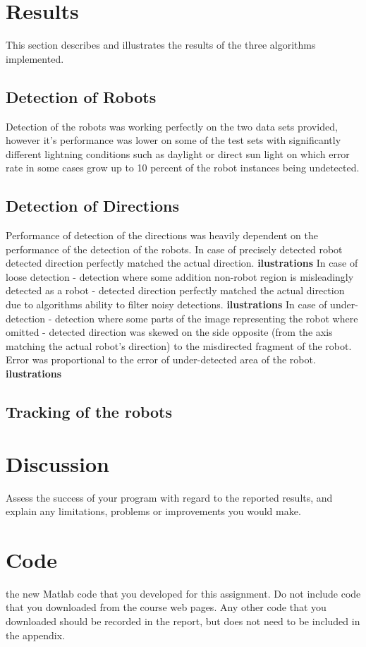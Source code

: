 \documentclass[10pt,a4paper,twocolumn]{article}
\begin{document}
\section{Results}
This section describes and illustrates the results of the three algorithms implemented. 
\subsection{Detection of Robots}
Detection of the robots was working perfectly on the two data sets provided, however it's performance was lower on some of the test sets with significantly different lightning conditions such as daylight or direct sun light on which error rate in some cases grow up to 10 percent of the robot instances being  undetected.  %
\subsection{Detection of Directions}
Performance of detection of the directions was heavily dependent on the performance of the detection of the robots. In case of precisely detected robot detected direction perfectly matched the actual direction. \textbf{ilustrations}
In case of loose detection - detection where some addition non-robot region is misleadingly detected as a robot - detected direction perfectly matched the actual direction due to algorithms ability to filter noisy detections. \textbf{ilustrations} 
In case of under-detection - detection where some parts of the image representing the robot where omitted - detected direction was skewed on the side opposite (from the axis matching the actual robot's direction) to the misdirected fragment of the robot. Error was proportional to the error of under-detected area of the robot. 
\textbf{ilustrations}
\subsection{Tracking of the robots}
\section{Discussion}
Assess the success of your program with regard to the reported results, and explain any limitations, problems or improvements you would make.
\section{Code}
the new Matlab code that you developed for this assignment. Do not
include code that you downloaded from the course web pages. Any other code
that you downloaded should be recorded in the report, but does not need to
be included in the appendix.
\end{document}

